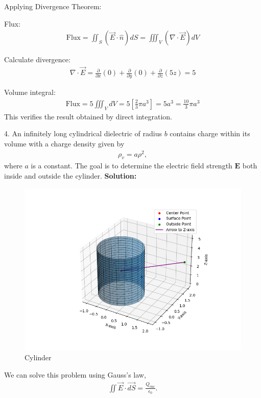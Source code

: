 \documentclass{article}
\begin{document}
Applying Divergence Theorem:

Flux:
\begin{align*}
\text{Flux} = \iint_S (\vec{E} \cdot \hat{n}) dS = \iiint_V (\nabla \cdot \vec{E}) dV
\end{align*}

Calculate divergence:
\begin{align*}
\nabla \cdot \vec{E} = 
    \frac{\partial}{\partial x}(0) +
    \frac{\partial}{\partial y}(0) +
    \frac{\partial}{\partial z}(5z) = 5
\end{align*}

Volume integral:
\begin{align*}
\text{Flux} = 5 \iiint_V dV
= 5 \left[\frac{2}{3}\pi a^3\right]
= 5a^3
= \frac{10}{3} \pi a^3
\end{align*}
This verifies the result obtained by direct integration.
\newline \newline

4. An infinitely long cylindrical dielectric of radius $b$ contains charge within its volume with a charge density given by
\begin{align*}
\rho_v = a \rho^2,
\end{align*}
where $a$ is a constant. The goal is to determine the electric field strength $\mathbf{E}$ both inside and outside the cylinder.\newline
\textbf{Solution: }\newline
\begin{figure}[h!]
   \centering
   \includegraphics[width=1\columnwidth]{figs/q4.png}
    \caption{Cylinder}
   \label{label}
\end{figure}
We can solve this problem using Gauss's law,
\begin{align*}
\iint \vec{E} \cdot \vec{dS} = \frac{Q_{\text{enc}}}{\epsilon_0}.
\end{align*}
\end{document}
